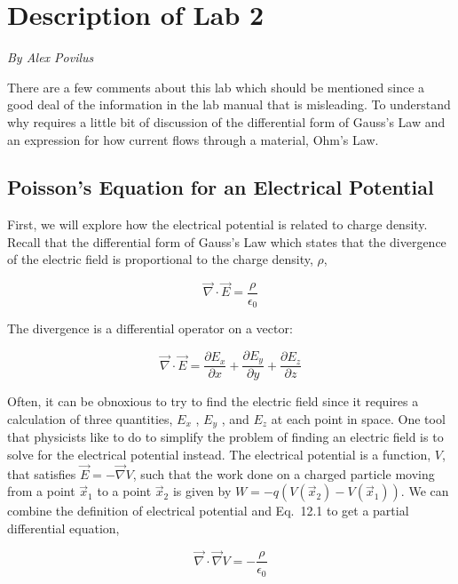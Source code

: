 \documentclass[12pt]{book}
\begin{document}
\section{Description of Lab 2}

{\it By Alex Povilus}

There are a few comments about this lab which should be mentioned since a good deal of the information
in the lab manual that is misleading. To understand why requires a little bit of discussion of the differential form of Gauss’s Law and an expression for how current flows through a material, Ohm’s Law.

\subsection{Poisson’s Equation for an Electrical Potential}

First, we will explore how the electrical potential is related to charge density. Recall that the differential form of Gauss’s Law which states that the divergence of the electric field is proportional to the charge density, $\rho$,

\begin{equation}
 \vec{\nabla}\cdot \vec{E} = \frac{\rho}{\epsilon_0}
\end{equation}

The divergence is a differential operator on a vector:

\begin{equation*}
  \vec{\nabla}\cdot \vec{E} = \frac{\partial E_x}{\partial x} +\frac{\partial E_y}{\partial y}+\frac{\partial E_z}{\partial z}
\end{equation*}

Often, it can be obnoxious to try to find the electric field since it requires a calculation of three quantities, $E_x$ , $E_y$ , and $E_z$ at each point in space. One tool that physicists like to do to simplify the problem of finding an electric field is to solve for the electrical potential instead. The electrical potential is a function, $V$, that satisfies $\vec{E} = -\vec{\nabla} V$, such that the work done on a charged particle moving from a point $\vec{x}_1$ to a point $\vec{x}_2$ is given by $W = −q(V(\vec{x}_2) − V(\vec{x}_1)).$ We can combine the definition of electrical potential and Eq.~12.1 to get a partial differential equation,

\begin{equation*}
 \vec{\nabla}\cdot \vec{\nabla} V = -\frac{\rho}{\epsilon_0}
\end{equation*}
\end{document}
